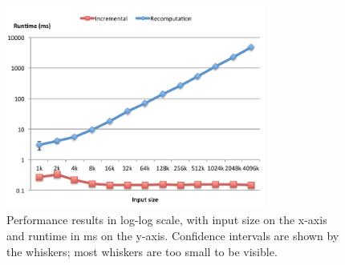 \begin{figure}
\includegraphics[keepaspectratio,width=8.5cm]{pldi14/HistogramGenerated-new.pdf}
\caption{Performance results in log-log scale, with input size on
  the x-axis and runtime in ms on the y-axis. Confidence
  intervals are shown by the whiskers; most whiskers are
  too small to be visible.}
\label{fig:graph}
\end{figure}
